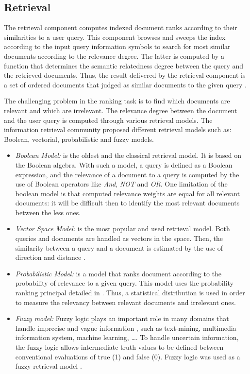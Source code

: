 		\subsection{Retrieval}

		The retrieval component computes indexed document ranks according to their similarities to a user query. 
		This component browses and sweeps the index according to the input query information symbols to 
		search for most similar documents according to the relevance degree. The latter is computed by a 
		function that determines the semantic relatedness degree between the query and the retrieved documents. 
		Thus, the result delivered by the retrieval component is a set of ordered documents that  judged 
		as similar documents to the given query \citep{Memar2013}. 

		The challenging problem in the ranking task is to find which documents are relevant and which
		are irrelevant. The relevance degree between the document and the user query is computed through
		various retrieval models. The information retrieval community proposed different retrieval models
		\citep{Baeza-Yates1999,Croft2010} such as: Boolean, vectorial, probabilistic and fuzzy models.

		\begin{itemize}
			\item \textit{Boolean Model:} is the oldest and the classical retrieval model. 
			It is based on the Boolean algebra. With such a model, a query is defined 
			as a Boolean expression, and the relevance of a document  to a query is computed by the 
			use of Boolean operators like \emph{And}, \emph{NOT} and \emph{OR}. One limitation of 
			the boolean model is that computed relevance weights are equal for all relevant documents: 
			it will be difficult then to identify the most relevant documents between the less ones.
	
			\item \textit{Vector Space Model:} is the most popular and used retrieval model. 
			Both queries and documents are handled as vectors in the space. Then, the 
			similarity between a query and a document is estimated by the use of direction 
			and distance \citep{Manning2008}. 

			\item \textit{Probabilistic Model:} is a model that ranks document according to the 
			probability of relevance to a given query. This model uses the probability ranking 
			principal detailed in \citep{Fuhr1992}. Thus, a statistical distribution is used in order 
			to measure the relevancy between relevant documents and irrelevant ones.

			\item \textit{Fuzzy model: } Fuzzy logic plays an important role in many domains that handle 
			imprecise and vague information \citep{Mantaras2015}, such as text-mining, multimedia 
			information system, machine learning, \dots{}. To handle uncertain information, 
			the fuzzy logic allows intermediate truth values to be defined between 
			conventional evaluations of true (1) and false (0). Fuzzy logic was used as a fuzzy 
			retrieval model \citep{Tahani1976,Cross1994,Miyamoto2012}.
		\end{itemize}

